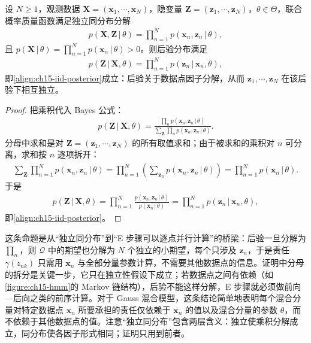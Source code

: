 \documentclass[../../main.tex]{subfiles}
\begin{document}
\begin{proposition}[后验在数据点上的因子分解]\label{proposition:ch15-后验因子分解}
设 $N\geqslant1$，观测数据 $\bm{X}=(\bm{x}_1,\cdots,\bm{x}_N)$，隐变量 $\bm{Z}=(\bm{z}_1,\cdots,\bm{z}_N)$，$\theta\in\Theta$，联合概率质量函数满足独立同分布分解
\begin{align*}
p(\bm{X},\bm{Z}\,|\,\theta)=\prod_{n=1}^{N}p(\bm{x}_n,\bm{z}_n\,|\,\theta),
\end{align*}
且 $p(\bm{X}\,|\,\theta)=\prod_{n=1}^{N}p(\bm{x}_n\,|\,\theta)>0$。则后验分布满足
\begin{align*}
p(\bm{Z}\,|\,\bm{X},\theta)=\prod_{n=1}^{N}p(\bm{z}_n\,|\,\bm{x}_n,\theta),
\end{align*}
即\eqref{align:ch15-iid-posterior}成立：后验关于数据点因子分解，从而 $\bm{z}_1,\cdots,\bm{z}_N$ 在该后验下相互独立。
\end{proposition}
\begin{proof}
把乘积代入 Bayes 公式：
\begin{align*}
p(\bm{Z}\,|\,\bm{X},\theta)=\frac{\prod_{n}p(\bm{x}_n,\bm{z}_n\,|\,\theta)}{\sum_{\bm{Z}}\prod_{n}p(\bm{x}_n,\bm{z}_n\,|\,\theta)}.
\end{align*}
分母中求和是对 $\bm{Z}=(\bm{z}_1,\cdots,\bm{z}_N)$ 的所有取值求和；由于被求和的乘积对 $n$ 可分离，求和按 $n$ 逐项拆开：
\begin{align*}
\sum_{\bm{Z}}\prod_{n=1}^{N}p(\bm{x}_n,\bm{z}_n\,|\,\theta)=\prod_{n=1}^{N}\left(\sum_{\bm{z}_n}p(\bm{x}_n,\bm{z}_n\,|\,\theta)\right)=\prod_{n=1}^{N}p(\bm{x}_n\,|\,\theta).
\end{align*}
于是
\begin{align*}
p(\bm{Z}\,|\,\bm{X},\theta)=\prod_{n=1}^{N}\frac{p(\bm{x}_n,\bm{z}_n\,|\,\theta)}{p(\bm{x}_n\,|\,\theta)}=\prod_{n=1}^{N}p(\bm{z}_n\,|\,\bm{x}_n,\theta),
\end{align*}
即\eqref{align:ch15-iid-posterior}。
\end{proof}

\begin{remark}
这条命题是从“独立同分布”到“E 步骤可以逐点并行计算”的桥梁：后验一旦分解为 $\prod_n$，则 $\mathcal{Q}$ 中的期望也分解为 $N$ 个独立的小期望，每个只涉及 $\bm{z}_n$，于是责任 $\gamma(z_{nk})$ 只需用 $\bm{x}_n$ 与全部分量参数计算，不需要其他数据点的信息。证明中分母的拆分是关键一步，它只在独立性假设下成立；若数据点之间有依赖（如\cref{figure:ch15-hmm}的 Markov 链结构），后验不能这样分解，E 步骤就必须做前向—后向之类的前序计算。对于 Gauss 混合模型，这条结论简单地表明每个混合分量对特定数据点 $\bm{x}_n$ 所要承担的责任仅依赖于 $\bm{x}_n$ 的值以及混合分量的参数 $\theta$，而不依赖于其他数据点的值。注意“独立同分布”包含两层含义：独立使乘积分解成立，同分布使各因子形式相同；证明只用到前者。
\end{remark}
\end{document}
